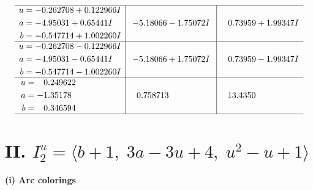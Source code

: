 \documentclass[1p]{elsarticle_modified}
\theoremstyle{definition}
\begin{document}
$$\begin{array}{c|c|c}
 \hline 
\begin{aligned}
u &= -0.262708 + 0.122966 I \\
a &= -4.95031 + 0.65441 I \\
b &= -0.547714 + 1.002260 I\end{aligned}
 & -5.18066 - 1.75072 I & \phantom{-}0.73959 + 1.99347 I \\ \hline\begin{aligned}
u &= -0.262708 - 0.122966 I \\
a &= -4.95031 - 0.65441 I \\
b &= -0.547714 - 1.002260 I\end{aligned}
 & -5.18066 + 1.75072 I & \phantom{-}0.73959 - 1.99347 I \\ \hline\begin{aligned}
u &= \phantom{-}0.249622\phantom{ +0.000000I} \\
a &= -1.35178\phantom{ +0.000000I} \\
b &= \phantom{-}0.346594\phantom{ +0.000000I}\end{aligned}
 & \phantom{-}0.758713\phantom{ +0.000000I} & \phantom{-}13.4350\phantom{ +0.000000I}\\
 \hline 
 \end{array}$$\newpage\newpage\renewcommand{\arraystretch}{1}
\centering \section*{II. $I^u_{2}= \langle b+1,\;3 a-3 u+4,\;u^2- u+1 \rangle$}
\flushleft \textbf{(i) Arc colorings}\\
\end{document}
